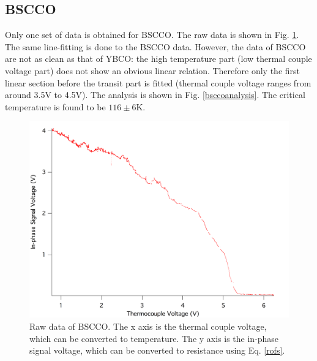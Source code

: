 \documentclass[prb,preprint]{revtex4-1}
\begin{document}
\subsection{BSCCO}
Only one set of data is obtained for BSCCO. The raw data is shown in Fig. \ref{bsccoraw}. The same line-fitting is done to the BSCCO data. However, the data of BSCCO are not as clean as that of YBCO: the high temperature part (low thermal couple voltage part) does not show an obvious linear relation. Therefore only the first linear section before the transit part is fitted (thermal couple voltage ranges from around 3.5V to 4.5V). The analysis is shown in Fig. \ref{bsccoanalysis}. The critical temperature is found to be $116\pm6$K.\\

\begin{figure}[h]
\centering
\includegraphics[width=14cm]{bscco_heating_raw.png}
\caption{Raw data of BSCCO. The x axis is the thermal couple voltage, which can be converted to temperature. The y axis is the in-phase signal voltage, which can be converted to resistance using Eq. \ref{rofs}.}
\label{bsccoraw}
\end{figure}
\end{document}
